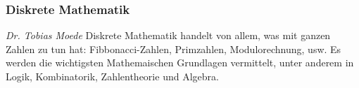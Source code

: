 
\subsubsection{Diskrete Mathematik}
	\textit{Dr. Tobias Moede}
	Diskrete Mathematik handelt von allem, was mit ganzen Zahlen zu tun hat: Fibbonacci-Zahlen, Primzahlen, Modulorechnung, usw. Es werden die wichtigsten Mathemaischen Grundlagen vermittelt, unter anderem in Logik, Kombinatorik, Zahlentheorie und Algebra. 
